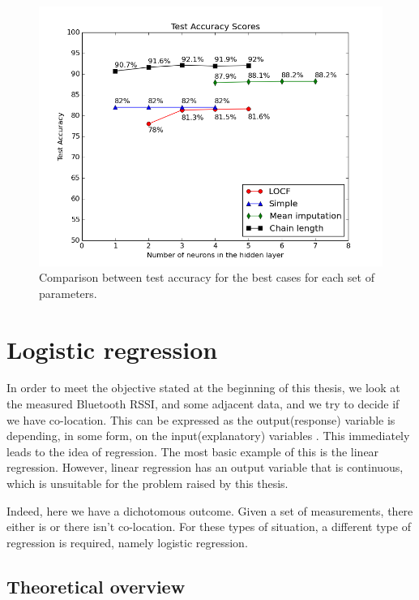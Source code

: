 \begin{figure}[h]
	\begin{center}
		\includegraphics[scale=0.6]{figures/ann_total.png}
	\end{center}
	
	\caption{Comparison between test accuracy for the best cases for each set of parameters.}
	\label{pic:ann_total}

\end{figure}
     

\section{Logistic regression}

In order to meet the objective stated at the beginning of this thesis, we look at the measured Bluetooth RSSI, and some adjacent data, and we try to decide if we have co-location. This can be expressed as the output(response) variable is depending, in some form, on the input(explanatory) variables \cite{logmodel1}. This immediately leads to the idea of regression. The most basic example of this is the linear regression. However, linear regression has an output variable that is continuous, which is unsuitable for the problem raised by this thesis.

Indeed, here we have a dichotomous outcome. Given a set of measurements, there either is or there isn't co-location. For these types of situation, a different type of regression is required, namely logistic regression. 

\subsection{Theoretical overview}

